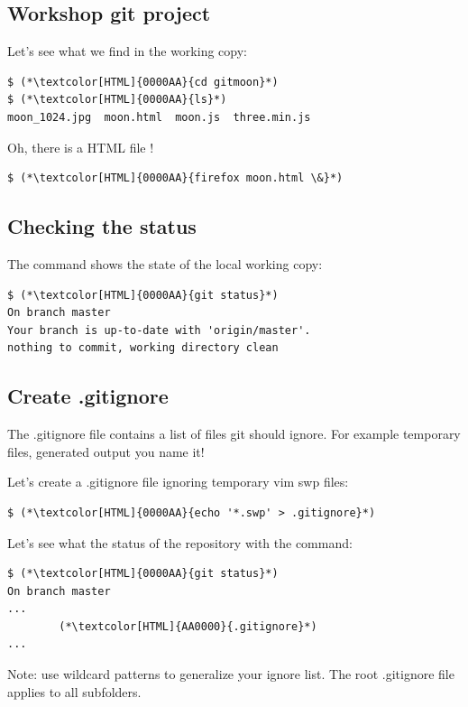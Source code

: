 \subsection{Workshop git project}
\begin{frame}[fragile]
  \subslidetitle
  Let's see what we find in the working copy:
  \begin{lstlisting}
$ (*\textcolor[HTML]{0000AA}{cd gitmoon}*)
$ (*\textcolor[HTML]{0000AA}{ls}*)
moon_1024.jpg  moon.html  moon.js  three.min.js
\end{lstlisting}

  \vspace{1em}
  Oh, there is a HTML file !
  \begin{lstlisting}
$ (*\textcolor[HTML]{0000AA}{firefox moon.html \&}*)
\end{lstlisting}
\end{frame}

\subsection{Checking the status}
\begin{frame}[fragile]
  \subslidetitle

  The command  shows the state of the local working copy:
  \begin{lstlisting}
$ (*\textcolor[HTML]{0000AA}{git status}*)
On branch master
Your branch is up-to-date with 'origin/master'.
nothing to commit, working directory clean
\end{lstlisting}
\end{frame}

\subsection{Create .gitignore}
\begin{frame}[fragile]
  \subslidetitle
  The .gitignore file contains a list of files git should ignore. For example temporary files, generated output you name it!

  \vspace{2em}
  Let's create a .gitignore file ignoring temporary vim swp files:
  \begin{lstlisting}
$ (*\textcolor[HTML]{0000AA}{echo '*.swp' > .gitignore}*)
\end{lstlisting}

  Let's see what the status of the repository with the  command:
  \begin{lstlisting}
$ (*\textcolor[HTML]{0000AA}{git status}*)
On branch master
...
        (*\textcolor[HTML]{AA0000}{.gitignore}*)
...
\end{lstlisting}

  \vspace{1em}
  Note: use wildcard patterns to generalize your ignore list. The root .gitignore file applies to all subfolders.

\end{frame}

